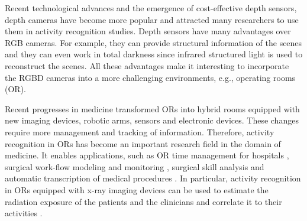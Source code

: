 \documentclass[a4paper, 10pt, conference]{ieeeconf}      %
\begin{document}
Recent technological advances and the emergence of cost-effective depth sensors, depth cameras have become more popular and attracted many researchers to use them in activity recognition studies. Depth sensors have many advantages over RGB cameras. For example, they can provide structural information of the scenes and they can even work in total darkness since infrared structured light is used to reconstruct the scenes. All these advantages make it interesting to incorporate the RGBD cameras into a more challenging environments, e.g., operating rooms (OR).

Recent progresses in medicine transformed ORs into hybrid rooms equipped with new imaging devices, robotic arms, sensors and electronic devices. These changes require more management and tracking of information. Therefore, activity recognition in ORs has become an important research field in the domain of medicine. It enables applications, such as OR time management for hospitals \cite{c2}, surgical work-flow modeling and monitoring \cite{c4}, surgical skill analysis \cite{c5} and automatic transcription of medical procedures \cite{c6}. In particular, activity recognition in ORs equipped with x-ray imaging devices can be used to estimate  the radiation exposure of the patients and the clinicians and correlate it to their activities \cite{c7}. 


\end{document}

